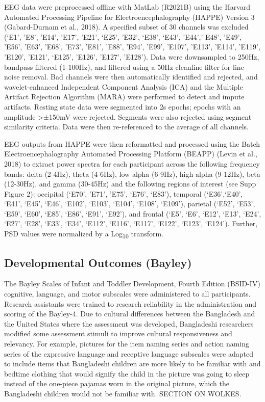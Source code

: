 \documentclass{article}
\begin{document}
EEG data were preprocessed offline with MatLab (R2021B) using the Harvard Automated Processing Pipeline for Electroencephalography (HAPPE) Version 3 (Gabard-Durnam et al., 2018).
A specified subset of 30 channels was excluded (‘E1’, ’E8’, ’E14’, ’E17’, ’E21’, ‘E25’, ’E32’, ‘E38’, ‘E43’, ’E44’,’ E48’, ’E49’, ’E56’, ’E63’, ’E68’, ’E73’, ’E81’, ’E88’, ’E94’, ’E99’, ’E107’, ’E113’, ’E114’, ’E119’, ’E120’, ’E121’, ‘E125', 'E126', 'E127', 'E128').
Data were downsampled to 250Hz, bandpass filtered (1-100Hz), and filtered using a 50Hz cleanline filter for line noise removal.
Bad channels were then automatically identified and rejected, and wavelet-enhanced Independent Component Analysis (ICA) and the Multiple Artifact Rejection Algorithm (MARA) were performed to detect and impute artifacts.
Resting state data were segmented into 2s epochs; epochs with an amplitude >±150mV were rejected.
Segments were also rejected using segment similarity criteria.
Data were then re-referenced to the average of all channels.

EEG outputs from HAPPE were then reformatted and processed using the Batch Electroencephalography Automated Processing Platform (BEAPP) (Levin et al., 2018) to extract power spectra for each participant across the following frequency bands: delta (2-4Hz), theta (4-6Hz), low alpha (6-9Hz), high alpha (9-12Hz), beta (12-30Hz), and gamma (30-45Hz) and the following regions of interest (see Supp Figure 2): occipital (‘E70’, ’E71’, ’E75’, ‘E76’, ‘E83’), temporal (‘E36’,‘E40’, ‘E41’, ‘E45’, ‘E46’, ‘E102’, ‘E103’, ‘E104’, ‘E108’, ‘E109’), parietal (‘E52’, ‘E53’, ‘E59’, ‘E60’, ‘E85’, ‘E86’, ‘E91’, ‘E92’), and frontal (‘E5’, ‘E6’, ‘E12’, ‘E13’, ‘E24’, ‘E27’, ‘E28’, ‘E33’, ‘E34’, ‘E112’, ‘E116’, ‘E117’, ‘E122’, ‘E123’, ‘E124’).
Further, PSD values were normalized by a Log\textsubscript{10} transform.

\subsection*{Developmental Outcomes (Bayley)}
The Bayley Scales of Infant and Toddler Development, Fourth Edition (BSID-IV) cognitive, language, and motor subscales were administered to all participants.
Research assistants were trained to research reliability in the administration and scoring of the Bayley-4.
Due to cultural differences between the Bangladesh and the United States where the assessment was developed, Bangladeshi researchers modified some assessment stimuli to improve cultural responsiveness and relevancy.
For example, pictures for the item naming series and action naming series of the expressive language and receptive language subscales were adapted to include items that Bangladeshi children are more likely to be familiar with and bedtime clothing that would signify the child in the picture was going to sleep instead of the one-piece pajamas worn in the original picture, which the Bangladeshi children would not be familiar with. 
SECTION ON WOLKES.
\end{document}
